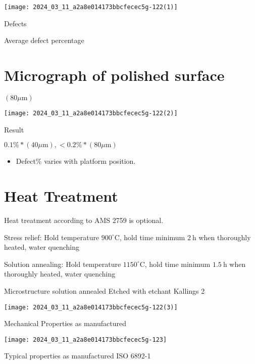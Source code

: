 \documentclass[10pt]{article}
\begin{document}
\begin{center}
\texttt{[image: 2024\_03\_11\_a2a8e014173bbcfecec5g-122(1)]}
\end{center}

Defects

Average defect percentage

\section*{Micrograph of polished surface}
 $(80 \mu \mathrm{m})$\begin{center}
\texttt{[image: 2024\_03\_11\_a2a8e014173bbcfecec5g-122(2)]}
\end{center}

Result

$0.1 \% *(40 \mu \mathrm{m}),<0.2 \% *(80 \mu \mathrm{m})$

\begin{itemize}
  \item Defect\% varies with platform position.
\end{itemize}

\section*{Heat Treatment}
Heat treatment according to AMS 2759 is optional.

Stress relief: Hold temperature $900^{\circ} \mathrm{C}$, hold time minimum $2 \mathrm{~h}$ when thoroughly heated, water quenching

Solution annealing: Hold temperature $1150^{\circ} \mathrm{C}$, hold time minimum $1.5 \mathrm{~h}$ when thoroughly heated, water quenching

Microstructure solution annealed Etched with etchant Kallings 2

\begin{center}
\texttt{[image: 2024\_03\_11\_a2a8e014173bbcfecec5g-122(3)]}
\end{center}

Mechanical Properties as manufactured

\begin{center}
\texttt{[image: 2024\_03\_11\_a2a8e014173bbcfecec5g-123]}
\end{center}

Typical properties as manufactured ISO 6892-1
\end{document}

